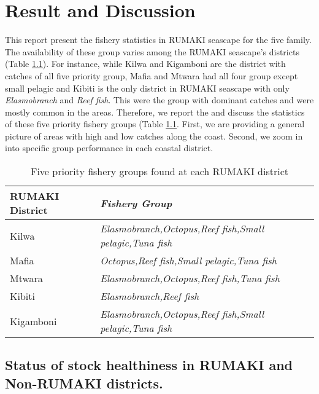 \documentclass[
  12pt,
  a4paper,
  oneside]{book}
\begin{document}
\hypertarget{result-and-discussion}{%
\chapter{Result and Discussion}\label{result-and-discussion}}

This report present the fishery statistics in RUMAKI seascape for the five family. The availability of these group varies among the RUMAKI seascape's districts (Table \ref{tab:tab31}). For instance, while Kilwa  and Kigamboni  are the district with catches of all five priority group, Mafia  and Mtwara  had all four group except small pelagic and Kibiti  is the only district in RUMAKI seascape with only \emph{Elasmobranch} and \emph{Reef fish}. This were the group with dominant catches and were mostly common in the areas. Therefore, we report the and discuss the statistics of these five priority fishery groups (Table \ref{tab:tab31}. First, we are providing a general picture of areas with high and low catches along the coast. Second, we zoom in into specific group performance in each coastal district.

\begin{table}[!h]

\caption{\label{tab:tab31}Five priority fishery groups found at each RUMAKI district}
\centering
\fontsize{10}{12}\selectfont
\begin{tabular}[t]{>{\raggedright\arraybackslash}p{2.5in}>{\em}l}
\toprule
RUMAKI District & Fishery Group\\
\midrule
Kilwa & Elasmobranch,Octopus,Reef fish,Small pelagic,Tuna fish\\
Mafia & Octopus,Reef fish,Small pelagic,Tuna fish\\
Mtwara & Elasmobranch,Octopus,Reef fish,Tuna fish\\
Kibiti & Elasmobranch,Reef fish\\
Kigamboni & Elasmobranch,Octopus,Reef fish,Small pelagic,Tuna fish\\
\bottomrule
\end{tabular}
\end{table}

\hypertarget{status-of-stock-healthiness-in-rumaki-and-non-rumaki-districts.}{%
\section{Status of stock healthiness in RUMAKI and Non-RUMAKI districts.}\label{status-of-stock-healthiness-in-rumaki-and-non-rumaki-districts.}}
\end{document}
